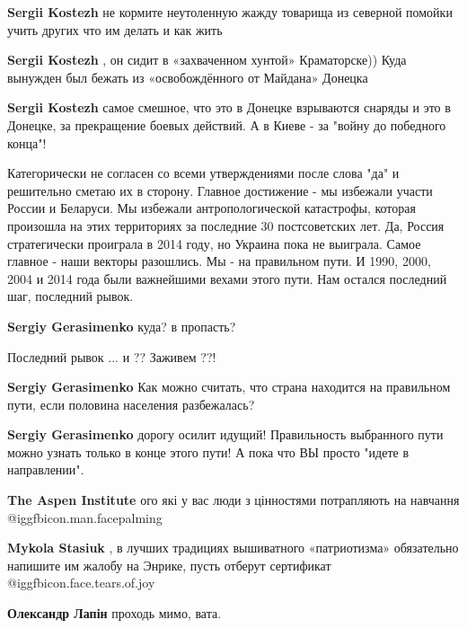 \begin{itemize}
\begin{itemize}
\textbf{Sergii Kostezh} не кормите неутоленную жажду товарища из северной помойки учить других что им делать и как жить

\textbf{Sergii Kostezh} , он сидит в «захваченном хунтой» Краматорске)) Куда вынужден был бежать из «освобождённого от Майдана» Донецка

\textbf{Sergii Kostezh} самое смешное, что это в Донецке взрываются снаряды и это в Донецке, за прекращение боевых действий. А в Киеве - за "войну до победного конца"!

\end{itemize} %


Категорически не согласен со всеми утверждениями после слова "да" и решительно
сметаю их в сторону. Главное достижение - мы избежали участи России и Беларуси.
Мы избежали антропологической катастрофы, которая произошла на этих территориях
за последние 30 постсоветских лет. Да, Россия стратегически проиграла в 2014
году, но Украина пока не выиграла. Самое главное - наши векторы разошлись. Мы -
на правильном пути. И 1990, 2000, 2004 и 2014 года были важнейшими вехами этого
пути. Нам остался последний шаг, последний рывок.

\begin{itemize} %
\textbf{Sergiy Gerasimenko} куда? в пропасть?

Последний рывок ... и ?? Заживем ??!

\textbf{Sergiy Gerasimenko} Как можно считать, что страна находится на правильном пути, если половина населения разбежалась?

\textbf{Sergiy Gerasimenko} дорогу осилит идущий! Правильность выбранного пути можно узнать только в конце этого пути! А пока что ВЫ просто "идете в направлении".
\end{itemize} %

\textbf{The Aspen Institute} ого які у вас люди з цінностями потрапляють на навчання @igg{fbicon.man.facepalming} 

\begin{itemize} %
\textbf{Mykola Stasiuk} , в лучших традициях вышиватного «патриотизма» обязательно напишите им жалобу на Энрике, пусть отберут сертификат  @igg{fbicon.face.tears.of.joy} 

\textbf{Олександр Лапін} проходь мимо, вата.


\end{itemize}
\end{itemize}
